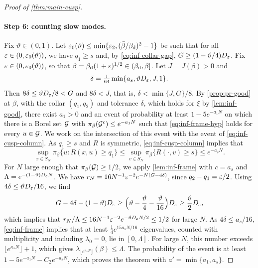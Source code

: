 \begin{proof}[Proof of \cref{thm:main-cusp}]
\paragraph{Step 6: counting slow modes.} Fix $\vartheta\in(0,1)$. Let $\varepsilon_0(\vartheta)\le\min\{\varepsilon_2,(\bar\beta/\beta_{\mathrm d})^2-1\}$ be such that for all $\varepsilon\in(0,\varepsilon_0(\vartheta))$, we have $q_1\ge s$ and, by \eqref{eq:inf-collar-gap}, $G\ge(1-\vartheta/4)D_\varepsilon$. Fix $\varepsilon\in(0,\varepsilon_0(\vartheta))$, so that $\beta=\beta_{\mathrm d}(1+\varepsilon)^{1/2}\in(\beta_{\mathrm d},\bar\beta]$. Let $J=J(\beta)>0$ and
\begin{equation*}
\delta=\tfrac1{64}\min\{a_s,\vartheta D_\varepsilon,J,1\}.
\end{equation*}
Then $8\delta\le\vartheta D_\varepsilon/8<G$ and $8\delta<J$, that is, $\delta<\min\{J,G\}/8$. By \cref{prop:pr-good} at $\beta$, with the collar $(q_1,q_2)$ and tolerance $\delta$, which holds for $\xi$ by \cref{lem:inf-good}, there exist $a_1>0$ and an event of probability at least $1-5e^{-a_1N}$ on which there is a Borel set $\mathcal G$ with $\pi_\beta(\mathcal G^c)\le e^{-a_1N}$ such that \eqref{eq:inf-frame-hyp} holds for every $u\in\mathcal G$. We work on the intersection of this event with the event of \eqref{eq:inf-cusp-column}. As $q_1\ge s$ and $R$ is symmetric, \eqref{eq:inf-cusp-column} implies that
\begin{equation*}
\sup_{x\in S_N}\pi_\beta\{u:R(x,u)\ge q_1\}\le\sup_{v\in S_N}\pi_\beta\{R(\cdot,v)\ge s\}\le e^{-a_sN}.
\end{equation*}
For $N$ large enough that $\pi_\beta(\mathcal G)\ge1/2$, we apply \cref{lem:inf-frame} with $c=a_s$ and $\Lambda=e^{-(1-\vartheta)D_\varepsilon N}$. We have $r_N=16N^{-1}\varepsilon^{-2}e^{-N(G-4\delta)}$, since $q_2-q_1=\varepsilon/2$. Using $4\delta\le\vartheta D_\varepsilon/16$, we find
\begin{equation*}
G-4\delta-(1-\vartheta)D_\varepsilon\ge\Bigl(\vartheta-\frac\vartheta4-\frac\vartheta{16}\Bigr)D_\varepsilon\ge\frac\vartheta2D_\varepsilon,
\end{equation*}
which implies that $r_N/\Lambda\le16N^{-1}\varepsilon^{-2}e^{-\vartheta D_\varepsilon N/2}\le1/2$ for large $N$. As $4\delta\le a_s/16$, \eqref{eq:inf-frame} implies that at least $\frac14e^{15a_sN/16}$ eigenvalues, counted with multiplicity and including $\lambda_0=0$, lie in $[0,\Lambda]$. For large $N$, this number exceeds $\lfloor e^{\kappa_*N}\rfloor+1$, which gives $\lambda_{\lfloor e^{\kappa_*N}\rfloor}(\beta)\le\Lambda$. The probability of the event is at least $1-5e^{-a_1N}-C_2e^{-a_sN}$, which proves the theorem with $a'=\min\{a_1,a_s\}$.
\end{proof}

